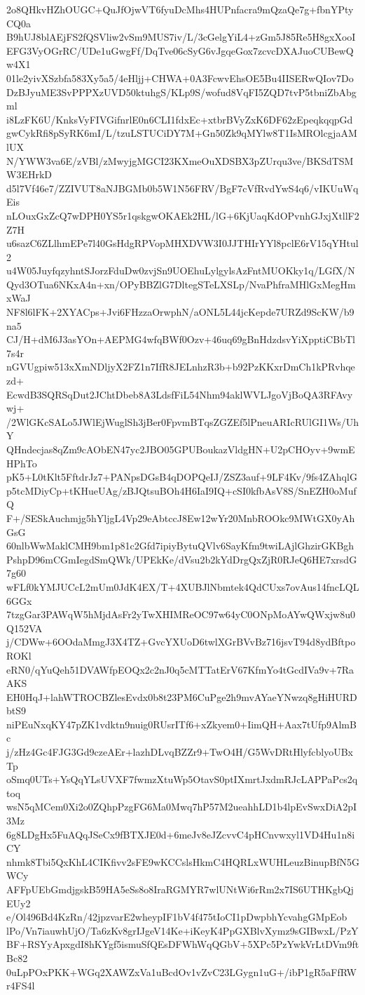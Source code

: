 2o8QHkvHZhOUGC+QuJfOjwVT6fyuDcMhs4HUPnfacra9mQzaQe7g+fbnYPtyCQ0a
B9hUJ8blAEjFS2fQSVliw2vSm9MUS7iv/L/3cGelgYiL4+zGm5J85Re5H8gxXooI
EFG3VyOGrRC/UDe1uGwgFf/DqTve06cSyG6vJgqeGox7zcvcDXAJuoCUBewQw4X1
01le2yivXSzbfa583Xy5a5/4eHljj+CHWA+0A3FcwvEhsOE5Bu4IISERwQIov7Do
DzBJyuME3SvPPPXzUVD50ktuhgS/KLp9S/wofud8VqFI5ZQD7tvP5tbniZbAbgml
i8LzFK6U/KnksVyFIVGifnrlE0n6CLI1fdxEc+xtbrBVyZxK6DF62zEpeqkqqpGd
gwCykRfi8pSyRK6mI/L/tzuLSTUCiDY7M+Gn50Zk9qMYlw8T1IsMROlcgjaAMlUX
N/YWW3va6E/zVBl/zMwyjgMGCI23KXmeOuXDSBX3pZUrqu3ve/BKSdTSMW3EHrkD
d5l7Vf46e7/ZZIVUT8aNJBGMb0b5W1N56FRV/BgF7cVfRvdYwS4q6/vIKUuWqEis
nLOuxGxZcQ7wDPH0YS5r1qskgwOKAEk2HL/lG+6KjUaqKdOPvnhGJxjXtllF2Z7H
u6sazC6ZLlhmEPe7l40GsHdgRPVopMHXDVW3I0JJTHIrYYl8pclE6rV15qYHtul2
u4W05JuyfqzyhntSJorzFduDw0zvjSn9UOEhuLylgylsAzFntMUOKky1q/LGfX/N
Qyd3OTua6NKxA4n+xn/OPyBBZlG7DltegSTeLXSLp/NvaPhfraMHlGxMegHmxWaJ
NF8l6lFK+2XYACps+Jvi6FHzzaOrwphN/aONL5L44jcKepde7URZd9ScKW/b9na5
CJ/H+dM6J3asYOn+AEPMG4wfqBWf0Ozv+46uq69gBnHdzdsvYiXpptiCBbTl7s4r
nGVUgpiw513xXmNDljyX2FZ1n7IfR8JELnhzR3b+b92PzKKxrDmCh1kPRvhqezd+
EcwdB3SQRSqDut2JChtDbeb8A3LdsfFiL54Nhm94aklWVLJgoVjBoQA3RFAvywj+
/2WlGKcSALo5JWlEjWuglSh3jBer0FpvmBTqsZGZEf5lPneuARIcRUlGI1Ws/UhY
QHndecjas8qZm9cAObEN47yc2JBO05GPUBoukazVldgHN+U2pCHOyv+9wmEHPhTo
pK5+L0tKlt5FftdrJz7+PANpsDGsB4qDOPQeIJ/ZSZ3auf+9LF4Kv/9fs4ZAhqlG
p5tcMDiyCp+tKHueUAg/zBJQtsuBOh4H6IaI9IQ+cSI0kfbAsV8S/SnEZH0oMufQ
F+/SESkAuchmjg5hYljgL4Vp29eAbtccJ8Ew12wYr20MnbROOkc9MWtGX0yAhGsG
60nlbWwMaklCMH9bm1p81c2Gfd7ipiyBytuQVlv6SayKfm9twiLAjlGhzirGKBgh
PshpD96mCGmIegdSmQWk/UPEkKe/dVsu2b2kYdDrgQxZjR0RJeQ6HE7xrsdG7g60
wFLf0kYMJUCcL2mUm0JdK4EX/T+4XUBJlNbmtek4QdCUxs7ovAus14fncLQL6GGx
7tzgGar3PAWqW5hMjdAsFr2yTwXHIMReOC97w64yC0ONpMoAYwQWxjw8u0Q152VA
j/CDWw+6OOdaMmgJ3X4TZ+GvcYXUoD6twlXGrBVvBz716jsvT94d8ydBftpoROKl
eRN0/qYuQeh51DVAWfpEOQx2c2nJ0q5cMTTatErV67KfmYo4tGcdIVa9v+7RaAKS
EH0HqJ+lahWTROCBZlesEvdx0b8t23PM6CuPge2h9mvAYaeYNwzq8gHiHURDbtS9
niPEuNxqKY47pZK1vdktn9nuig0RUsrITf6+xZkyem0+IimQH+Aax7tUfp9AlmBc
j/zHz4Gc4FJG3Gd9czeAEr+lazhDLvqBZZr9+TwO4H/G5WvDRtHlyfcblyoUBxTp
oSmq0UTs+YsQqYLsUVXF7fwmzXtuWp5OtavS0ptIXmrtJxdmRJcLAPPaPcs2qtoq
wsN5qMCem0Xi2o0ZQhpPzgFG6Ma0Mwq7hP57M2ueahhLD1b4lpEvSwxDiA2pI3Mz
6g8LDgHx5FuAQqJSeCx9fBTXJE0d+6meJv8eJZcvvC4pHCnvwxyl1VD4Hu1n8iCY
nhmk8Tbi5QxKhL4CIKfivv2sFE9wKCCslsHkmC4HQRLxWUHLeuzBinupBfN5GWCy
AFFpUEbGmdjgskB59HA5eSs8o8IraRGMYR7wlUNtWi6rRm2x7IS6UTHKgbQjEUy2
e/Ol496Bd4KzRn/42jpzvarE2wheypIF1bV4f475tIoCI1pDwpbhYcvahgGMpEob
lPo/Vn7iauwhUjO/Ta6zKv8grIJgeV14Ke+iKeyK4PpGXBlvXymz9sGIBwxL/PzY
BF+RSYyApxgdI8hKYgf5ismuSfQEsDFWhWqQGbV+5XPc5PzYwkVrLtDVm9ftBc82
0uLpPOxPKK+WGq2XAWZxVa1uBcdOv1vZvC23LGygn1uG+/ibP1gR5aFfRWr4FS4l
